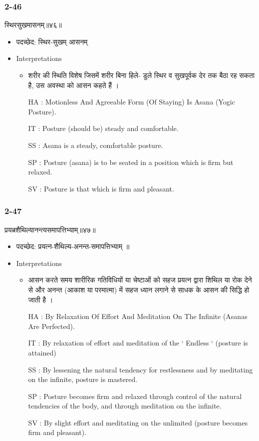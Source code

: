 \begin{frame}[fragile]\frametitle{2-46}
\begin{sanskrit}
स्थिरसुखमासनम्॥४६॥
\end{sanskrit}

	\begin{itemize}
	\item पदच्छेद: स्थिर-सुखम् आसनम्
	\item Interpretations
		\begin{itemize}
		\item शरीर की स्थिति विशेष जिसमें शरीर बिना हिले- डुले स्थिर व सुखपूर्वक देर तक बैठा रह सकता है, उस अवस्था को आसन कहते हैं ।
		\item [HA]: Motionless And Agreeable Form (Of Staying) Is Asana (Yogic Posture).
		\item [IT]: Posture (should be) steady and comfortable.
		\item [SS]: Asana is a steady, comfortable posture.
		\item [SP]: Posture (asana) is to be seated in a position which is firm but relaxed.
		\item [SV]: Posture is that which is firm and pleasant. 
		\end{itemize}
	\end{itemize}	
\end{frame}


\begin{frame}[fragile]\frametitle{2-47}
\begin{sanskrit}
प्रयत्नशैथिल्यानन्त्यसमापत्तिभ्याम्॥४७॥
\end{sanskrit}

	\begin{itemize}
	\item पदच्छेद: प्रयत्न-शैथिल्य-अनन्त-समापत्तिभ्याम् ॥
	\item Interpretations
		\begin{itemize}
		\item आसन करते समय शारीरिक गतिविधियों या चेष्टाओं को सहज प्रयत्न द्वारा शिथिल या रोक देने से और अनन्त (आकाश या परमात्मा) में सहज ध्यान लगाने से साधक के आसन की सिद्धि हो जाती है ।
		\item [HA]: By Relaxation Of Effort And Meditation On The Infinite (Asanas Are Perfected).
		\item [IT]: By relaxation of effort and meditation of the ‘ Endless ‘ (posture is attained)
		\item [SS]: By lessening the natural tendency for restlessness and by meditating on the infinite, posture is mastered.
		\item [SP]: Posture becomes firm and relaxed through control of the natural tendencies of the body, and through meditation on the infinite.
		\item [SV]: By slight effort and meditating on the unlimited (posture becomes firm and pleasant). 
		\end{itemize}
	\end{itemize}	
\end{frame}


